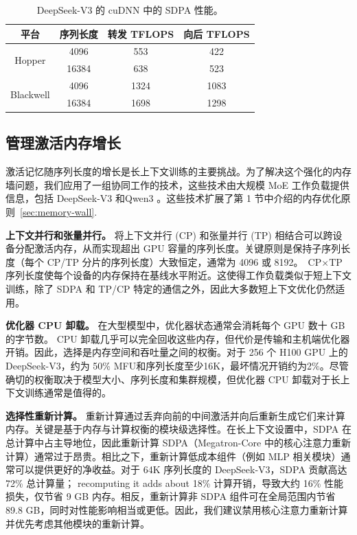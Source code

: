 \documentclass[10pt,logo,copyright]{nvidiatechreport_zh}
\begin{document}
\begin{table}[ht]
\centering
\caption{DeepSeek-V3 的 cuDNN 中的 SDPA 性能。}
\label{tab:sdpa-cudnn-perf}
\begin{tabular}{cccc}
\toprule
\textbf{平台} & \textbf{序列长度} & \textbf{转发 TFLOPS} & \textbf{向后 TFLOPS} \\
\midrule
\multirow{2}{*}{Hopper}
 & 4096  & 553  & 422 \\
 & 16384 & 638  & 523 \\
\midrule
\multirow{2}{*}{Blackwell}
 & 4096  & 1324 & 1083 \\
 & 16384 & 1698 & 1298 \\
\bottomrule
\end{tabular}
\end{table}

\subsection{管理激活内存增长}

激活记忆随序列长度的增长是长上下文训练的主要挑战。为了解决这个强化的内存墙问题，我们应用了一组协同工作的技术，这些技术由大规模 MoE 工作负载提供信息，包括 DeepSeek-V3 \cite{deepseekai2025deepseekv3technicalreport} 和Qwen3 \cite{yang2025qwen3technicalreport}。这些技术扩展了第 1 节中介绍的内存优化原则~\ref{sec:memory-wall}.

\textbf{上下文并行和张量并行。}
将上下文并行 (CP) 和张量并行 (TP) 相结合可以跨设备分配激活内存，从而实现超出 GPU 容量的序列长度。关键原则是保持子序列长度（每个 CP/TP 分片的序列长度）大致恒定，通常为 4096 或 8192。 $\text{CP} \times \text{TP}$ 序列长度使每个设备的内存保持在基线水平附近。这使得工作负载类似于短上下文训练，除了 SDPA 和 TP/CP 特定的通信之外，因此大多数短上下文优化仍然适用。

\textbf{优化器 CPU 卸载。}
在大型模型中，优化器状态通常会消耗每个 GPU 数十 GB 的字节数。 CPU 卸载几乎可以完全回收这些内存，但代价是传输和主机端优化器开销。因此，选择是内存空间和吞吐量之间的权衡。对于 256 个 H100 GPU 上的 DeepSeek-V3，约为 50\% MFU和序列长度至少16K，最坏情况开销约为2\%。尽管确切的权衡取决于模型大小、序列长度和集群规模，但优化器 CPU 卸载对于长上下文训练通常是值得的。

\textbf{选择性重新计算。}
重新计算通过丢弃向前的中间激活并向后重新生成它们来计算内存。关键是基于内存与计算权衡的模块级选择性。在长上下文设置中，SDPA 在总计算中占主导地位，因此重新计算 SDPA（Megatron-Core 中的核心注意力重新计算）通常过于昂贵。相比之下，重新计算低成本组件（例如 MLP 相关模块）通常可以提供更好的净收益。对于 64K 序列长度的 DeepSeek-V3，SDPA 贡献高达 72\% 总计算量； recomputing it adds about 18\% 计算开销，导致大约 16\% 性能损失，仅节省 9 GB 内存。相反，重新计算非 SDPA 组件可在全局范围内节省 89.8 GB，同时对性能影响相当或更低。因此，我们建议禁用核心注意力重新计算并优先考虑其他模块的重新计算。
\end{document}
